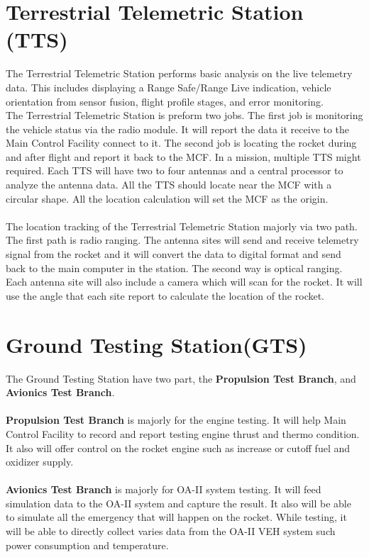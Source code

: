 \documentclass[12pt,article]{memoir}
\begin{document}
\section{Terrestrial Telemetric Station (TTS)}
The Terrestrial Telemetric Station performs basic analysis on the live telemetry data. This includes displaying a Range Safe/Range Live indication, vehicle orientation from sensor fusion, flight profile stages, and error monitoring.\\
The Terrestrial Telemetric Station is preform two jobs. The first job is monitoring the vehicle status via the radio module. It will report the data it receive to the Main Control Facility connect to it. The second job is locating the rocket during and after flight and report it back to the MCF. In a mission, multiple TTS might required. Each TTS will have two to four antennas and a central processor to analyze the antenna data. All the TTS should locate near the MCF with a circular shape. All the location calculation will set the MCF as the origin.\\\\
The location tracking of the Terrestrial Telemetric Station majorly via two path. The first path is radio ranging. The antenna sites will send and receive telemetry signal from the rocket and it will convert the data to digital format and send back to the main computer in the station. The second way is optical ranging. Each antenna site will also include a camera which will scan for the rocket. It will use the angle that each site report to calculate the location of the rocket. 
\section{Ground Testing Station(GTS)}
The Ground Testing Station have two part, the \textbf{Propulsion Test Branch}, and \textbf{Avionics Test Branch}.\\\\
\textbf{Propulsion Test Branch} is majorly for the engine testing. It will help Main Control Facility to record and report testing engine thrust and thermo condition. It also will offer control on the rocket engine such as increase or cutoff fuel and oxidizer supply.\\\\
\textbf{Avionics Test Branch} is majorly for OA-II system testing. It will feed simulation data to the OA-II system and capture the result. It also will be able to simulate all the emergency that will happen on the rocket. While testing, it will be able to directly collect varies data from the OA-II VEH system such power consumption and temperature.
\newpage
\end{document}
